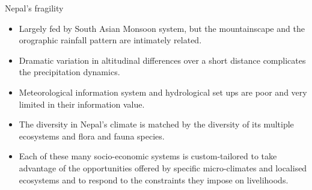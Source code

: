 \documentclass[
  ignorenonframetext,
  aspectratio=169]{beamer}
\providecommand{\tightlist}{%
  \setlength{\itemsep}{0pt}\setlength{\parskip}{0pt}}
\begin{document}
\begin{frame}{}
\protect\hypertarget{section-4}{}
\end{frame}

\begin{frame}{Nepal's fragility}
\protect\hypertarget{nepals-fragility}{}
\begin{itemize}
\tightlist
\item
  Largely fed by South Asian Monsoon system, but the mountainscape and
  the orographic rainfall pattern are intimately related.
\item
  Dramatic variation in altitudinal differences over a short distance
  complicates the precipitation dynamics.
\item
  Meteorological information system and hydrological set ups are poor
  and very limited in their information value.
\item
  The diversity in Nepal's climate is matched by the diversity of its
  multiple ecosystems and flora and fauna species.
\item
  Each of these many socio-economic systems is custom-tailored to take
  advantage of the opportunities offered by specific micro-climates and
  localised ecosystems and to respond to the constraints they impose on
  livelihoods.
\end{itemize}
\end{frame}
\end{document}
